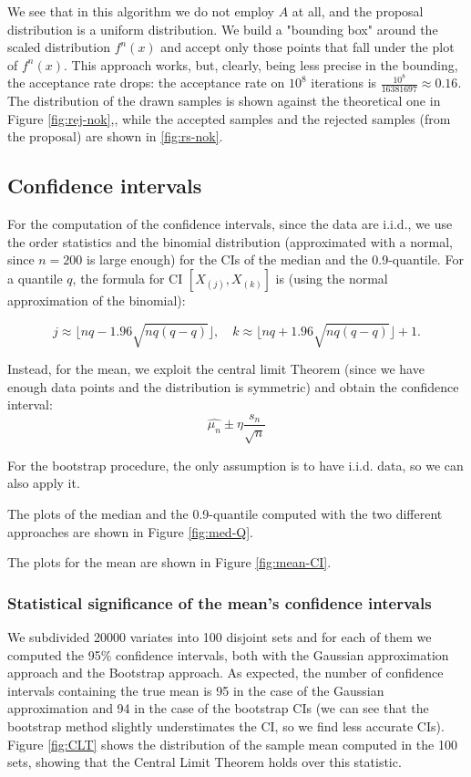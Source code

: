 \documentclass[a4paper,12pt]{article}
\begin{document}
We see that in this algorithm we do not employ $A$ at all, and the proposal distribution is a uniform distribution. We build a "bounding box" around the scaled distribution $f^n(x)$ and accept only those points that fall under the plot of $f^n(x)$. This approach works, but, clearly, being less precise in the bounding, the acceptance rate drops: the acceptance rate on $10^8$ iterations is $\frac{10^8}{16381697} \approx 0.16$. The distribution of the drawn samples is shown against the theoretical one in Figure \ref{fig:rej-nok},, while the accepted samples and the rejected samples (from the proposal) are shown in \ref{fig:rs-nok}.


\subsection*{Confidence intervals}
For the computation of the confidence intervals, since the data are i.i.d., we use the order statistics and the binomial distribution (approximated with a normal, since $n=200$ is large enough) for the CIs of the median and the 0.9-quantile.
For a quantile $q$, the formula for CI $[X_{(j)},X_{(k)}]$ is (using the normal approximation of the binomial):

\begin{equation*}
    j \approx \lfloor nq-1.96\sqrt{nq(q-q)} \rfloor, \quad k \approx \lfloor nq+1.96\sqrt{nq(q-q)} \rfloor +1.
\end{equation*}

Instead, for the mean, we exploit the central limit Theorem (since we have enough data points and the distribution is symmetric) and obtain the confidence interval:
\begin{equation*}
    \hat{\mu_n} \pm \eta\frac{s_n}{\sqrt{n}}
\end{equation*}


For the bootstrap procedure, the only assumption is to have i.i.d. data, so we can also apply it.

The plots of the median and the 0.9-quantile computed with the two different approaches are shown in Figure \ref{fig:med-Q}.

The plots for the mean are shown in Figure \ref{fig:mean-CI}.

\subsubsection*{Statistical significance of the mean's confidence intervals}

We subdivided 20000 variates into 100 disjoint sets and for each of them we computed the 95\% confidence intervals, both with the Gaussian approximation approach and the Bootstrap approach. As expected, the number of confidence intervals containing the true mean is 95 in the case of the Gaussian approximation and 94 in the case of the bootstrap CIs (we can see that the bootstrap method slightly understimates the CI, so we find less accurate CIs). Figure \ref{fig:CLT} shows the distribution of the sample mean computed in the 100 sets, showing that the Central Limit Theorem holds over this statistic.
\end{document}
